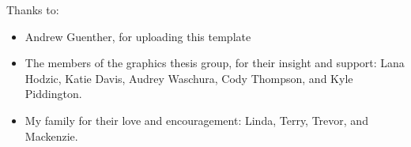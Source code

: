 \noindent
Thanks to:
\begin{itemize}
	\item Andrew Guenther, for uploading this template
	\item The members of the graphics thesis group, for their insight and support: Lana Hodzic, Katie Davis, Audrey Waschura, Cody Thompson, and Kyle Piddington.
	\item My family for their love and encouragement: Linda, Terry, Trevor, and Mackenzie.
\end{itemize}
